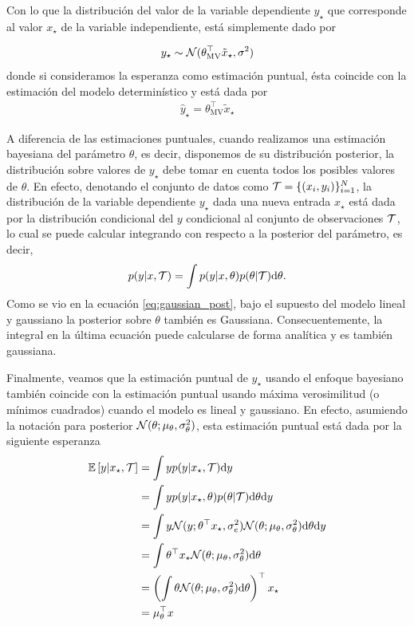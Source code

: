 Con lo que la distribución del valor de la variable dependiente $y_\star$ que corresponde al valor $x_\star$ de la variable independiente, está simplemente dado por 

\begin{align}
	 y_\star \sim  {\mathcal N}(\theta_{\text{MV}}^\top \tilde{x}_\star,\sigma^2) 
\end{align}
donde si consideramos la esperanza como estimación puntual, ésta coincide con la estimación del modelo determinístico y está dada por 
\begin{align}
	 \hat{y}_\star  = \theta_{\text{MV}}^\top \tilde{x}_\star
\end{align}

A diferencia de las estimaciones puntuales, cuando realizamos una estimación bayesiana del parámetro $\theta$, es decir, disponemos de su distribución posterior, la distribución sobre valores de $y_\star$ debe tomar en cuenta todos los posibles valores de $\theta$. En efecto, denotando el conjunto de datos como ${\mathcal T}=\{(x_i,y_i)\}_{i=1}^N$, la distribución de la variable dependiente $y_\star$ dada una nueva entrada $x_\star$ está dada por la distribución condicional del $y$ condicional al conjunto de observaciones ${\mathcal T}$, lo cual se puede calcular integrando con respecto a la posterior del parámetro, es decir, 
\begin{equation}
 	p(y|x,{\mathcal T}) = \int p(y|x, \theta)p(\theta|{\mathcal T}) {\text d}\theta.
 \end{equation} 
Como se vio en la ecuación \eqref{eq:gaussian_post}, bajo el supuesto del modelo lineal y gaussiano la posterior sobre $\theta$ también es Gaussiana. Consecuentemente, la integral en la última ecuación puede calcularse de forma analítica y es también gaussiana. 

Finalmente, veamos que la estimación puntual de $y_\star$ usando el enfoque bayesiano también coincide con la estimación puntual usando máxima verosimilitud (o mínimos cuadrados) cuando el modelo es lineal y gaussiano. En efecto, asumiendo la notación para posterior ${\mathcal N}(\theta;\mu_\theta, \sigma_\theta^2)$, esta estimación puntual está dada por la siguiente esperanza
\begin{align}
	\operatorname{\mathbb{E}}\left[y|x_\star,{\mathcal T}\right] 
	&= \int y p(y|x_\star,{\mathcal T}) {\text d} y \\
	&= \int y p(y|x_\star, \theta)p(\theta|{\mathcal T}) {\text d} \theta {\text d} y \nonumber\\
	&= \int y {\mathcal N}(y;\theta^\top x_\star ,\sigma_e^2){\mathcal N}(\theta;\mu_\theta, \sigma_\theta^2) {\text d}\theta {\text d} y \nonumber\\
	&= \int \theta^\top x_\star {\mathcal N}(\theta;\mu_\theta, \sigma_\theta^2) {\text d} \theta \nonumber\\
	&= \left(\int \theta {\mathcal N}(\theta;\mu_\theta, \sigma_\theta^2) {\text d} \theta\right)^\top x_\star \nonumber\\
	&= \mu_\theta^\top x \nonumber
\end{align}

